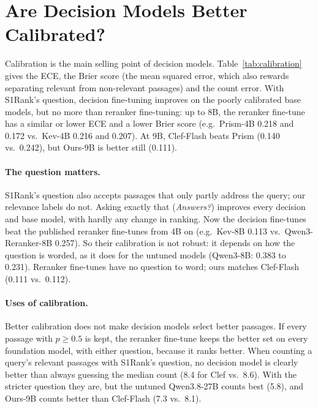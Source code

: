 \section{Are Decision Models Better Calibrated?}
\label{sec:calibration}



Calibration is the main selling point of decision models. Table~\ref{tab:calibration} gives the ECE, the Brier score
(the mean squared error, which also rewards separating relevant from non-relevant passages) and the count error. With S1Rank's question, decision fine-tuning
improves on the poorly calibrated base models, but no more than reranker fine-tuning: up to 8B, the reranker
fine-tune has a similar or lower ECE and a lower Brier score (e.g.\ Prism-4B 0.218 and 0.172 vs.\ Kev-4B 0.216 and
0.207). At 9B, Clef-Flash beats Prism (0.140 vs.\ 0.242), but Ours-9B is better still (0.111).

\paragraph{The question matters.}
S1Rank's question also accepts passages that only partly address the query; our relevance labels do not. Asking exactly that (\emph{Answers?}) improves every decision and base model, with hardly
any change in ranking. Now the decision fine-tunes beat the published reranker fine-tunes from 4B on (e.g.\ Kev-8B
0.113 vs.\ Qwen3-Reranker-8B 0.257). So their calibration is not robust: it depends on how the question is worded,
as it does for the untuned models (Qwen3-8B: 0.383 to 0.231). Reranker fine-tunes have no question to word; ours
matches Clef-Flash (0.111 vs.\ 0.112).

\paragraph{Uses of calibration.}
Better calibration does not make decision models select better passages. If every passage with $p \ge 0.5$ is kept, the reranker fine-tune keeps the better set on every foundation model, with either question,
because it ranks better. When counting a query's relevant passages with S1Rank's question, no decision model is
clearly better than always guessing the median count (8.4 for Clef vs.\ 8.6). With the stricter question
they are, but the untuned Qwen3.8-27B counts best (5.8), and Ours-9B counts better than Clef-Flash (7.3
vs.\ 8.1).
